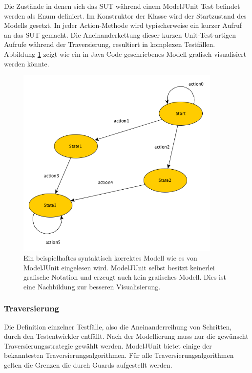 Die Zustände in denen sich das SUT während einem ModelJUnit Test befindet werden als Enum definiert. Im Konstruktor der Klasse wird der Startzustand des Modells gesetzt. In jeder Action-Methode wird typischerweise ein kurzer Aufruf an das SUT gemacht. Die Aneinanderkettung dieser kurzen Unit-Test-artigen Aufrufe während der Traversierung, resultiert in komplexen Testfällen.\\
Abbildung \ref{fig:modeljunit} zeigt wie ein in Java-Code geschriebenes Modell grafisch visualisiert werden könnte. 

\begin{figure}[h] 
  \centering
     \includegraphics[width=0.9\textwidth]{figures/modelljunit_modell.png}
  \caption{Ein beispielhaftes syntaktisch korrektes Modell wie es von ModelJUnit eingelesen wird. ModelJUnit selbst besitzt keinerlei grafische Notation und erzeugt auch kein grafisches Modell. Dies ist eine Nachbildung zur besseren Visualisierung.}
  \label{fig:modeljunit}
\end{figure}

\subsubsection{Traversierung}
Die Definition einzelner Testfälle, also die Aneinanderreihung von Schritten, durch den Testentwickler entfällt. Nach der Modellierung muss nur die gewünscht Traversierungsstrategie gewählt werden. ModelJUnit bietet einige der bekanntesten Traversierungsalgorithmen. Für alle Traversierungsalgorithmen gelten die Grenzen die durch Guards aufgestellt werden.

